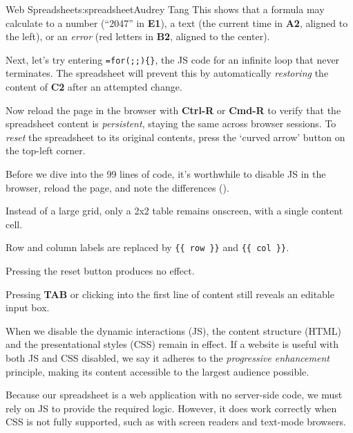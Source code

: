 \begin{aosachapter}{Web Spreadsheet}{s:spreadsheet}{Audrey Tang}
This shows that a formula may calculate to a number (``2047'' in
\textbf{E1}), a text (the current time in \textbf{A2}, aligned to the
left), or an \emph{error} (red letters in \textbf{B2}, aligned to the
center).

Next, let's try entering \texttt{=for(;;)\{\}}, the JS code for an
infinite loop that never terminates. The spreadsheet will prevent this
by automatically \emph{restoring} the content of \textbf{C2} after an
attempted change.

Now reload the page in the browser with \textbf{Ctrl-R} or
\textbf{Cmd-R} to verify that the spreadsheet content is
\emph{persistent}, staying the same across browser sessions. To
\emph{reset} the spreadsheet to its original contents, press the `curved
arrow' button on the top-left corner.

\label{progressive-enhancement}

Before we dive into the 99 lines of code, it's worthwhile to disable JS
in the browser, reload the page, and note the differences
().

\begin{aosaitemize}

\item
  Instead of a large grid, only a 2x2 table remains onscreen, with a
  single content cell.
\item
  Row and column labels are replaced by \texttt{\{\{ row \}\}} and
  \texttt{\{\{ col \}\}}.
\item
  Pressing the reset button produces no effect.
\item
  Pressing \textbf{TAB} or clicking into the first line of content still
  reveals an editable input box.
\end{aosaitemize}


When we disable the dynamic interactions (JS), the content structure
(HTML) and the presentational styles (CSS) remain in effect. If a
website is useful with both JS and CSS disabled, we say it adheres to
the \emph{progressive enhancement} principle, making its content
accessible to the largest audience possible.

Because our spreadsheet is a web application with no server-side code,
we must rely on JS to provide the required logic. However, it does work
correctly when CSS is not fully supported, such as with screen readers
and text-mode browsers.


\end{aosachapter}

